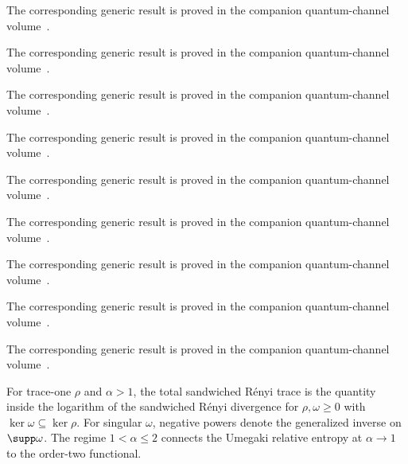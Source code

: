 The corresponding generic result is proved in the companion quantum-channel volume~\cite[``Full-support eigenbasis whitening as a Choi matrix'']{QICLean2026Blueprint}.



The corresponding generic result is proved in the companion quantum-channel volume~\cite[``Full-support eigenbasis whitened Choi estimate'']{QICLean2026Blueprint}.



The corresponding generic result is proved in the companion quantum-channel volume~\cite[``Real powers under unitary conjugation'']{QICLean2026Blueprint}.



The corresponding generic result is proved in the companion quantum-channel volume~\cite[``Real powers of positive tensor products'']{QICLean2026Blueprint}.



The corresponding generic result is proved in the companion quantum-channel volume~\cite[``Inverse quarter-power from iterated square roots'']{QICLean2026Blueprint}.



The corresponding generic result is proved in the companion quantum-channel volume~\cite[``Unitary invariance of the order-two functional'']{QICLean2026Blueprint}.



The corresponding generic result is proved in the companion quantum-channel volume~\cite[``Reindexing invariance of the order-two functional'']{QICLean2026Blueprint}.



The corresponding generic result is proved in the companion quantum-channel volume~\cite[``Faithful marginal whitening bound'']{QICLean2026Blueprint}.



The corresponding generic result is proved in the companion quantum-channel volume~\cite[``Marginal-support whitening bound'']{QICLean2026Blueprint}.


For trace-one $\rho$ and $\alpha>1$, the total sandwiched R\'enyi trace is the
quantity inside the logarithm of the sandwiched R\'enyi divergence
\cite[Equation~(3)]{Beigi2013Sandwiched}
\cite[Definition~2]{MullerLennert2013Renyi} for $\rho,\omega\geq0$ with
$\ker\omega\subseteq\ker\rho$. For singular $\omega$, negative powers denote
the generalized inverse on $\supp\omega$. The regime $1<\alpha\leq2$ connects
the Umegaki relative entropy at $\alpha\to 1$ to the order-two functional.


